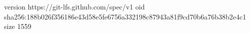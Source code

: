 version https://git-lfs.github.com/spec/v1
oid sha256:188b026f356186e43d58e5fe6756a332198c87943a81f9cd70b6a76b38b2e4c1
size 1559

